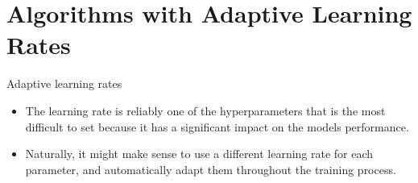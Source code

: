 \section{Algorithms with Adaptive Learning Rates}

\begin{vbframe}{Adaptive learning rates}
  \begin{itemize}
    \item The learning rate is reliably one of the hyperparameters that is the most difficult to set because it has a significant impact on the models performance.
    \item Naturally, it might make sense to use a different learning rate for each parameter, and automatically adapt them throughout the training process.
  \end{itemize}
\end{vbframe}

